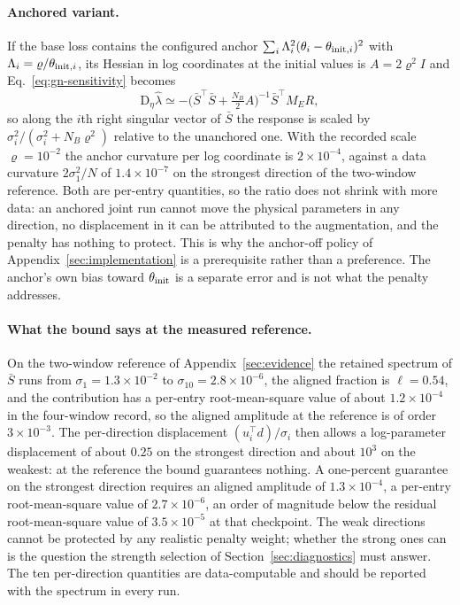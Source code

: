 \documentclass[11pt,a4paper]{article}
\newcommand{\D}{\mathrm D}
\theoremstyle{remark}
\begin{document}
\paragraph{Anchored variant.}
If the base loss contains the configured anchor $\sum_i\Lambda_i^2(\theta_i-\theta_{{\rm init},i})^2$ with $\Lambda_i=\varrho/\theta_{{\rm init},i}$, its Hessian in log coordinates at the initial values is $A=2\varrho^2I$ and Eq.~\eqref{eq:gn-sensitivity} becomes
\begin{equation}\label{eq:ridge}
 \D_\eta\hat\lambda\simeq-\Big(\bar S^\top\bar S+\tfrac{N_B}{2}A\Big)^{-1}\bar S^\top M_ER ,
\end{equation}
so along the $i$th right singular vector of $\bar S$ the response is scaled by $\sigma_i^2/(\sigma_i^2+N_B\varrho^2)$ relative to the unanchored one. With the recorded scale $\varrho=10^{-2}$ the anchor curvature per log coordinate is $2\times10^{-4}$, against a data curvature $2\sigma_1^2/N$ of $1.4\times10^{-7}$ on the strongest direction of the two-window reference. Both are per-entry quantities, so the ratio does not shrink with more data: an anchored joint run cannot move the physical parameters in any direction, no displacement in it can be attributed to the augmentation, and the penalty has nothing to protect. This is why the anchor-off policy of Appendix~\ref{sec:implementation} is a prerequisite rather than a preference. The anchor's own bias toward $\theta_{\rm init}$ is a separate error and is not what the penalty addresses.

\paragraph{What the bound says at the measured reference.}
On the two-window reference of Appendix~\ref{sec:evidence} the retained spectrum of $\bar S$ runs from $\sigma_1=1.3\times10^{-2}$ to $\sigma_{10}=2.8\times10^{-6}$, the aligned fraction is $\ell=0.54$, and the contribution has a per-entry root-mean-square value of about $1.2\times10^{-4}$ in the four-window record, so the aligned amplitude at the reference is of order $3\times10^{-3}$. The per-direction displacement $(u_i^\top d)/\sigma_i$ then allows a log-parameter displacement of about $0.25$ on the strongest direction and about $10^3$ on the weakest: at the reference the bound guarantees nothing. A one-percent guarantee on the strongest direction requires an aligned amplitude of $1.3\times10^{-4}$, a per-entry root-mean-square value of $2.7\times10^{-6}$, an order of magnitude below the residual root-mean-square value of $3.5\times10^{-5}$ at that checkpoint. The weak directions cannot be protected by any realistic penalty weight; whether the strong ones can is the question the strength selection of Section~\ref{sec:diagnostics} must answer. The ten per-direction quantities are data-computable and should be reported with the spectrum in every run.
\end{document}
